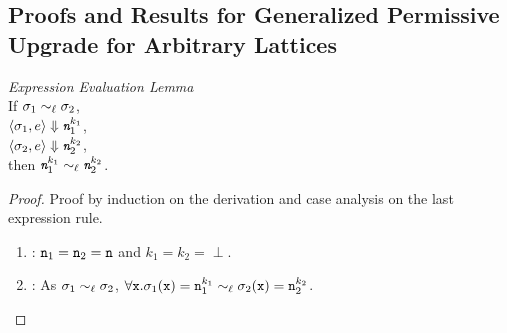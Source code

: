 \subsection{Proofs and Results for Generalized Permissive Upgrade for
  Arbitrary Lattices}
\label{app:gpu}
\begin{myLemma}{\emph{Expression Evaluation Lemma}}\\
\label{lem:app:gpua:exp}
If $\sigma_1 \sim_\ell \sigma_2$, \\
$\langle \sigma_1, e \rangle \Downarrow \emph{\texttt{n}}_1^{k_1}$, \\
$\langle \sigma_2, e \rangle \Downarrow \emph{\texttt{n}}_2^{k_2}$, \\
then
$\emph{\texttt{n}}_1^{k_1} \sim_\ell \emph{\texttt{n}}_2^{k_2}$.
\end{myLemma}
\begin{proof}
Proof by induction on the derivation and case analysis on the last
expression rule.
\begin{enumerate}
\item {}: $\texttt{n}_1 = \texttt{n}_2 = \texttt{n}$ and $k_1 = k_2 = \perp$. 

\item {}: As $\sigma_1 \sim_\ell \sigma_2$, $\forall \texttt{x}.\sigma_1(\texttt{x}) = \texttt{n}_1^{k_1}
  \sim_\ell \sigma_2(\texttt{x}) = \texttt{n}_2^{k_2}$. 


\end{enumerate}
\end{proof}
